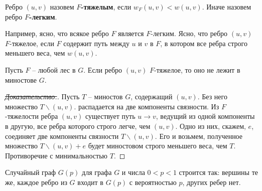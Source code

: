 \begin{definition*} Ребро $(u,v)$ назовем \textbf{$F$-тяжелым}, если $w_F(u,v) < w(u,v)$. Иначе назовем ребро \textbf{$F$-легким}.
\end{definition*}

Например, ясно, что всякое ребро $F$ является $F$-легким. Ясно, что ребро $(u,v)$ $F$-тяжелое, если $F$ содержит путь между $u$ и $v$ в $F$, в котором все ребра строго меньшего веса, чем $w(u,v)$.

\begin{lemma*} Пусть $F$ -- любой лес в $G$. Если ребро $(u,v)$ $F$-тяжелое, то оно не лежит в миностове $G$.
\end{lemma*}
\begin{proof}[\sout{Доказательство.}]
    Пусть $T$ -- миностов $G$, содержащий $(u,v)$. Без него множество $T\smallsetminus(u,v)$. распадается на две компоненты связности. Из $F$-тяжелости ребра $(u,v)$ существует путь $u\rightarrow v$, ведущий из одной компоненты в другую, все ребра которого строго легче, чем $(u,v)$. Одно из них, скажем, $e$, соединяет две компоненты связности $T\smallsetminus(u,v)$. Его и возьмем, полученное множество $T\smallsetminus(u,v) + e$ будет миностовом строго меньшего веса, чем $T$. Противоречие с минимальностью $T$.
\end{proof}

\begin{definition*}
    Случайный граф $G(p)$ для графа $G$ и числа $0 < p < 1$ строится так: вершины те же, каждое ребро из $G$ входит в $G(p)$ с вероятностью $p$, других ребер нет.
\end{definition*}

